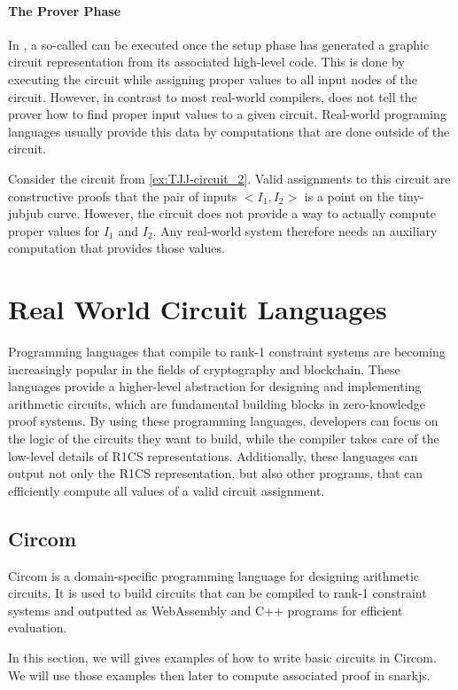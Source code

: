 \paragraph{The Prover Phase} In , a so-called  can be executed once the setup phase has generated a graphic circuit representation from its associated high-level code. This is done by executing the circuit while assigning proper values to all input nodes of the circuit. However, in contrast to most real-world compilers,  does not tell the prover how to find proper input values to a given circuit. Real-world programing languages usually provide this data by computations that are done outside of the circuit.
\begin{example} Consider the circuit from \examplename{} \ref{ex:TJJ-circuit_2}. Valid assignments to this circuit are constructive proofs that the pair of inputs $<I_1,I_2>$ is a point on the tiny-jubjub curve. However, the circuit does not provide a way to actually compute proper values for $I_1$ and $I_2$. Any real-world system therefore needs an auxiliary computation that provides those values.
\end{example}
\section{Real World Circuit Languages}
Programming languages that compile to rank-1 constraint systems are becoming increasingly popular in the fields of cryptography and blockchain. These languages provide a higher-level abstraction for designing and implementing arithmetic circuits, which are fundamental building blocks in zero-knowledge proof systems. By using these programming languages, developers can focus on the logic of the circuits they want to build, while the compiler takes care of the low-level details of R1CS representations. Additionally, these languages can output not only the R1CS representation, but also other programs, that can efficiently compute all values of a valid circuit assignment. 

\subsection{Circom}
Circom is a domain-specific programming language for designing arithmetic circuits. It is used to build circuits that can be compiled to rank-1 constraint systems and outputted as WebAssembly and C++ programs for efficient evaluation.

In this section, we will gives examples of how to write basic circuits in Circom. We will use those examples then later to compute associated proof in snarkjs. 

